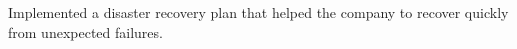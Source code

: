 \begin{cventries}
{\begin{cvitems}
        \item {Implemented a disaster recovery plan that helped the company to recover quickly from unexpected failures.}
      \end{cvitems}%
    }%
\end{cventries}
